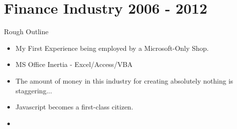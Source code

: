 \section{Finance Industry 2006 - 2012}
Rough Outline
\begin{itemize}
\item My First Experience being employed by a Microsoft-Only Shop.
\item MS Office Inertia - Excel/Access/VBA
\item The amount of money in this industry for creating absolutely
  nothing is staggering...
\item Javascript becomes a first-class citizen.
\item 

\end{itemize}


